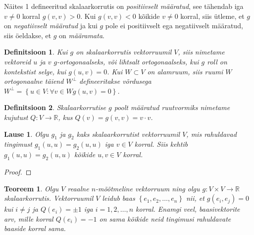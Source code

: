 \documentclass[a4paper,12pt]{article}
\newtheorem{theorem}{Teoreem}
\newtheorem{definition}{Definitsioon}
\newtheorem{proposition}{Lause}
\numberwithin{equation}{section}
\begin{document}
Näites 1 defineeritud skalaarkorrutis on \textit{positiivselt määratud}, see tähendab iga $v \neq 0$ korral $g \left(v, v \right) > 0$. Kui $g \left(v, v \right) < 0$ kõikide $v \neq 0$ korral, siis ütleme, et $g$ on \textit{negatiivselt määratud} ja kui $g$ pole ei positiivselt ega negatiivselt määratud, siis öeldakse, et $g$ on \textit{määramata}.

\begin{definition}
Kui $g$ on skalaarkorrutis vektorruumil $V$, siis nimetame vektoreid $u$ ja $v$ $g$-ortogonaalseks, või lihtsalt ortogonaalseks, kui $g$ roll on kontekstist selge, kui $g \left( u, v \right) = 0$. Kui $W \subset V$ on alamruum, siis ruumi $W$ ortogonaalne täiend $W^{\perp}$ defineeritakse võrdusega $W^{\perp} = \left\lbrace u \in V : \forall v \in W g \left(u, v \right) = 0 \right\rbrace$.
\end{definition}
\begin{definition}
Skalaarkorrutise $g$ poolt määratud ruutvormiks nimetame kujutust $Q : V \rightarrow \mathbb{R}$, kus $Q \left( v \right) = g\left(v, v\right) = v \cdot v$.
\end{definition}

\begin{proposition}
Olgu $g_1$ ja $g_2$ kaks skalaarkorrutist vektorruumil $V$, mis rahuldavad tingimust $g_1 \left(u, u \right) = g_2 \left(u, u \right)$ iga $v \in V$ korral. Siis kehtib $g_1 \left(u, u \right) = g_2 \left(u, u \right)$ kõikide $u, v \in V$ korral.
\end{proposition}

\begin{proof}
\lipsum[7]
\end{proof}

\begin{theorem}
Olgu $V$ reaalne $n$-mõõtmeline vektorruum ning olgu $g : V \times V \rightarrow \mathbb{R}$ skalaarkorrutis. Vektorruumil $V$ leidub baas $\left\lbrace e_1, e_2, \dots, e_n \right\rbrace$ nii, et $g \left(e_i, e_j\right) = 0$ kui $i \neq j$ ja $Q\left(e_i\right) = \pm 1$ iga $i = 1, 2, \dots, n$ korral. Enamgi veel, baasivektorite arv, mille korral $Q \left(e_i\right) = -1$ on sama kõikide neid tingimusi rahuldavate baaside korral sama.
\end{theorem}
\end{document}
